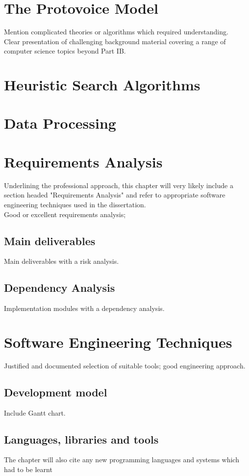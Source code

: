 \documentclass[12pt,a4paper,twoside,openright]{report}
\begin{document}
\section{The Protovoice Model}
Mention complicated theories or algorithms which required understanding. \\ 
Clear presentation of challenging background material covering a range of computer science topics beyond Part IB.

\section{Heuristic Search Algorithms}

\section{Data Processing}

\section{Requirements Analysis}
Underlining the professional approach, this chapter will very likely include a section headed "Requirements Analysis" and refer to appropriate software engineering techniques used in the dissertation. \\
Good or excellent requirements analysis; 
\par 
\subsection{Main deliverables}
Main deliverables with a risk analysis. 
\subsection{Dependency Analysis}
Implementation modules with a dependency analysis.

\section{Software Engineering Techniques}
Justified and documented selection of suitable tools; good engineering approach.

\subsection{Development model}
Include Gantt chart.

\subsection{Languages, libraries and tools}
The chapter will also cite any new programming languages and systems which had to be learnt 
\end{document}
